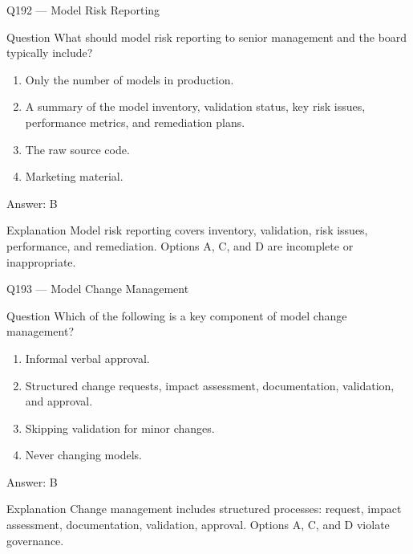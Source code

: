 \documentclass[aspectratio=169,8pt]{beamer}
\begin{document}
\begin{frame}{Q192 --- Model Risk Reporting}
	\begin{block}{Question}
		What should model risk reporting to senior management and the board typically include?
		\begin{enumerate}
			\item Only the number of models in production.
			\item A summary of the model inventory, validation status, key risk issues, performance metrics, and remediation plans.
			\item The raw source code.
			\item Marketing material.
		\end{enumerate}  \end{block}
		\begin{exampleblock}{Answer: B}\end{exampleblock}
		\begin{block}{Explanation}
			Model risk reporting covers inventory, validation, risk issues, performance, and remediation. Options A, C, and D are incomplete or inappropriate.
		\end{block}
	\end{frame}
	
\begin{frame}{Q193 --- Model Change Management}
\begin{block}{Question}
Which of the following is a key component of model change management?
\begin{enumerate}
\item Informal verbal approval.
\item Structured change requests, impact assessment, documentation, validation, and approval.
\item Skipping validation for minor changes.
\item Never changing models.
\end{enumerate}  \end{block}
\begin{exampleblock}{Answer: B}\end{exampleblock}
\begin{block}{Explanation}
Change management includes structured processes: request, impact assessment, documentation, validation, approval. Options A, C, and D violate governance.
\end{block}
\end{frame}
\end{document}
